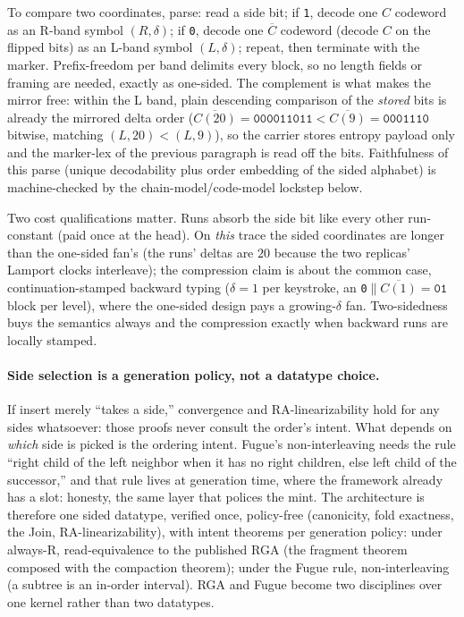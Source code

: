\documentclass[11pt]{article}
\newcommand{\code}[1]{\texttt{#1}}
\begin{document}
To compare two coordinates, parse: read a side bit; if \code{1},
decode one $C$ codeword as an R-band symbol $(R,\delta)$; if \code{0},
decode one $\overline{C}$ codeword (decode $C$ on the flipped bits) as
an L-band symbol $(L,\delta)$; repeat, then terminate with the marker.
Prefix-freedom per band delimits every block, so no length fields or
framing are needed, exactly as one-sided. The complement is what makes
the mirror free: within the L band, plain descending comparison of the
\emph{stored} bits is already the mirrored delta order ($
\overline{C(20)} = \code{000011011} < \overline{C(9)} = \code{0001110}
$ bitwise, matching $(L,20) < (L,9)$), so the carrier stores entropy
payload only and the marker-lex of the previous paragraph is read off
the bits. Faithfulness of this parse (unique decodability plus order
embedding of the sided alphabet) is machine-checked by the
chain-model/code-model lockstep below.

Two cost qualifications matter. Runs absorb the side bit like every other
run-constant (paid once at the head). On \emph{this} trace the sided
coordinates are longer than the one-sided fan's (the runs' deltas are
$20$ because the two replicas' Lamport clocks interleave); the
compression claim is about the common case, continuation-stamped
backward typing ($\delta = 1$ per keystroke, an \code{0}$\|
\overline{C(1)} = \code{01}$ block per level), where the one-sided design
pays a growing-$\delta$ fan. Two-sidedness buys the semantics always
and the compression exactly when backward runs are locally stamped.

\paragraph{Side selection is a generation policy, not a datatype
choice.} If insert merely ``takes a side,'' convergence and
RA-linearizability hold for any sides whatsoever: those proofs never
consult the order's intent. What depends on \emph{which} side is
picked is the ordering intent. Fugue's non-interleaving needs the rule
``right child of the left neighbor when it has no right children, else
left child of the successor,'' and that rule lives at generation time,
where the framework already has a slot: honesty, the same layer that
polices the mint. The architecture is therefore one sided datatype,
verified once, policy-free (canonicity, fold exactness, the Join,
RA-linearizability), with intent theorems per generation policy: under
always-R, read-equivalence to the published RGA (the fragment theorem
composed with the compaction theorem); under the Fugue rule,
non-interleaving (a subtree is an in-order interval). RGA and Fugue
become two disciplines over one kernel rather than two datatypes.
\end{document}
